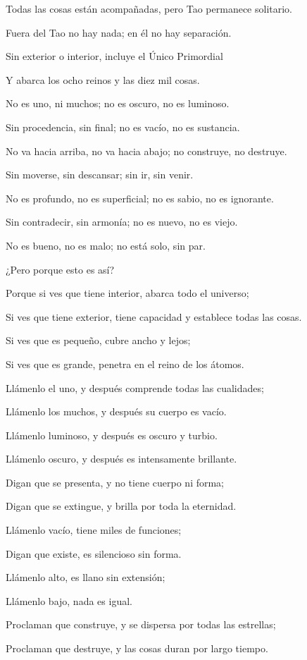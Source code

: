 Todas las cosas están acompañadas, pero Tao permanece solitario.

Fuera del Tao no hay nada; en él no hay separación.

Sin exterior o interior, incluye el Único Primordial

Y abarca los ocho reinos y las diez mil cosas.

No es uno, ni muchos; no es oscuro, no es luminoso.

Sin procedencia, sin final; no es vacío, no es sustancia.

No va hacia arriba, no va hacia abajo; no construye, no destruye.

Sin moverse, sin descansar; sin ir, sin venir.

No es profundo, no es superficial; no es sabio, no es ignorante.

Sin contradecir, sin armonía; no es nuevo, no es viejo.

No es bueno, no es malo; no está solo, sin par.

¿Pero porque esto es así?

Porque si ves que tiene interior, abarca todo el universo;

Si ves que tiene exterior, tiene capacidad y establece todas las cosas.

Si ves que es pequeño, cubre ancho y lejos;

Si ves que es grande, penetra en el reino de los átomos.

Llámenlo el uno, y después comprende todas las cualidades;

Llámenlo los muchos, y después su cuerpo es vacío.

Llámenlo luminoso, y después es oscuro y turbio.

Llámenlo oscuro, y después es intensamente brillante.

Digan que se presenta, y no tiene cuerpo ni forma;

Digan que se extingue, y brilla por toda la eternidad.

Llámenlo vacío, tiene miles de funciones;

Digan que existe, es silencioso sin forma.

Llámenlo alto, es llano sin extensión;

Llámenlo bajo, nada es igual.

Proclaman que construye, y se dispersa por todas las estrellas;

Proclaman que destruye, y las cosas duran por largo tiempo.

